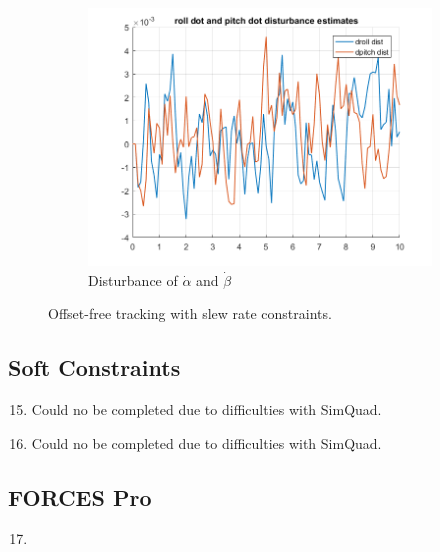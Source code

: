 \documentclass[11pt]{article}
\begin{document}
\begin{enumerate}
\begin{figure}[ht]
\begin{subfigure}[c]{0.3\linewidth}
            \includegraphics[width=\linewidth]{Plots_14_SlewRateConstraints/10}
            \caption{Disturbance of $\dot{\alpha}$ and $\dot{\beta}$}
        \end{subfigure}
        \caption{Offset-free tracking with slew rate constraints.}
        \label{fig:slew_rate}
\end{figure}
\end{enumerate}



\subsection*{Soft Constraints} %
\label{sub:soft_constraints}

\begin{enumerate}
    \setcounter{enumi}{14}
    \item Could no be completed due to difficulties with SimQuad.

    \item Could no be completed due to difficulties with SimQuad.

\end{enumerate}



\subsection*{FORCES Pro} %
\label{sub:forces_pro}

\begin{enumerate}
    \setcounter{enumi}{16}
    \item
\end{enumerate}

\end{document}
